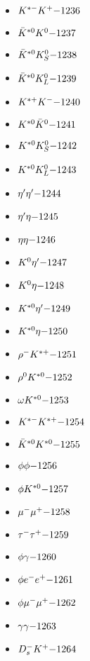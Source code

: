 \begin{multicols}{3}
\begin{itemize}
 \item $ K^{*-} K^{+} \hfill{-1236}$
 \item $ \bar{K}^{*0} K^{0} \hfill{-1237}$
 \item $ \bar{K}^{*0} K_{S}^{0} \hfill{-1238}$
 \item $ \bar{K}^{*0} K_{L}^{0} \hfill{-1239}$
 \item $ K^{*+} K^{-} \hfill{-1240}$
 \item $ K^{*0} \bar{K}^{0} \hfill{-1241}$
 \item $ K^{*0} K_{S}^{0} \hfill{-1242}$
 \item $ K^{*0} K_{L}^{0} \hfill{-1243}$
 \item $ {\eta^{\prime}} {\eta^{\prime}} \hfill{-1244}$
 \item $ {\eta^{\prime}} \eta \hfill{-1245}$
 \item $ \eta \eta \hfill{-1246}$
 \item $ K^{0} {\eta^{\prime}} \hfill{-1247}$
 \item $ K^{0} \eta \hfill{-1248}$
 \item $ K^{*0} {\eta^{\prime}} \hfill{-1249}$
 \item $ K^{*0} \eta \hfill{-1250}$
 \item $ \rho^{-} K^{*+} \hfill{-1251}$
 \item $ \rho^{0} K^{*0} \hfill{-1252}$
 \item $ \omega K^{*0} \hfill{-1253}$
 \item $ K^{*-} K^{*+} \hfill{-1254}$
 \item $ \bar{K}^{*0} K^{*0} \hfill{-1255}$
 \item $ \phi \phi \hfill{-1256}$
 \item $ \phi K^{*0} \hfill{-1257}$
 \item $ \mu^{-} \mu^{+} \hfill{-1258}$
 \item $ \tau^{-} \tau^{+} \hfill{-1259}$
 \item $ \phi \gamma \hfill{-1260}$
 \item $ \phi e^{-} e^{+} \hfill{-1261}$
 \item $ \phi \mu^{-} \mu^{+} \hfill{-1262}$
 \item $ \gamma \gamma \hfill{-1263}$
 \item $ D_{s}^{-} K^{+} \hfill{-1264}$
 \end{itemize} 
 \end{multicols} 
